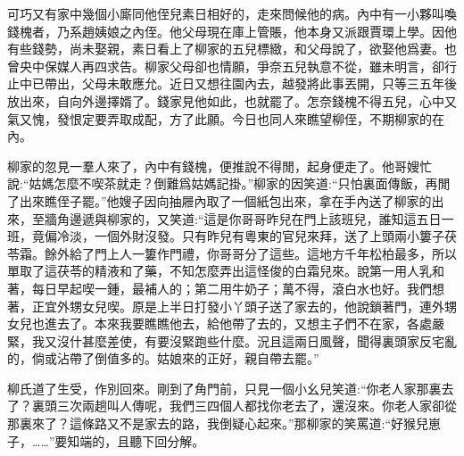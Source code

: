 \begin{parag}
    可巧又有家中幾個小廝同他侄兒素日相好的，走來問候他的病。內中有一小夥叫喚錢槐者，乃系趙姨娘之內侄。他父母現在庫上管賬，他本身又派跟賈環上學。因他有些錢勢，尚未娶親，素日看上了柳家的五兒標緻，和父母說了，欲娶他爲妻。也曾央中保媒人再四求告。柳家父母卻也情願，爭奈五兒執意不從，雖未明言，卻行止中已帶出，父母未敢應允。近日又想往園內去，越發將此事丟開，只等三五年後放出來，自向外邊擇婿了。錢家見他如此，也就罷了。怎奈錢槐不得五兒，心中又氣又愧，發恨定要弄取成配，方了此願。今日也同人來瞧望柳侄，不期柳家的在內。
\end{parag}


\begin{parag}
    柳家的忽見一羣人來了，內中有錢槐，便推說不得閒，起身便走了。他哥嫂忙說:“姑媽怎麼不喫茶就走？倒難爲姑媽記掛。”柳家的因笑道:“只怕裏面傳飯，再閒了出來瞧侄子罷。”他嫂子因向抽屜內取了一個紙包出來，拿在手內送了柳家的出來，至牆角邊遞與柳家的，又笑道:“這是你哥哥昨兒在門上該班兒，誰知這五日一班，竟偏冷淡，一個外財沒發。只有昨兒有粵東的官兒來拜，送了上頭兩小簍子茯苓霜。餘外給了門上人一簍作門禮，你哥哥分了這些。這地方千年松柏最多，所以單取了這茯苓的精液和了藥，不知怎麼弄出這怪俊的白霜兒來。說第一用人乳和著，每日早起喫一鍾，最補人的；第二用牛奶子；萬不得，滾白水也好。我們想著，正宜外甥女兒喫。原是上半日打發小丫頭子送了家去的，他說鎖著門，連外甥女兒也進去了。本來我要瞧瞧他去，給他帶了去的，又想主子們不在家，各處嚴緊，我又沒什甚麼差使，有要沒緊跑些什麼。況且這兩日風聲，聞得裏頭家反宅亂的，倘或沾帶了倒值多的。姑娘來的正好，親自帶去罷。”
\end{parag}


\begin{parag}
    柳氏道了生受，作別回來。剛到了角門前，只見一個小幺兒笑道:“你老人家那裏去了？裏頭三次兩趟叫人傳呢，我們三四個人都找你老去了，還沒來。你老人家卻從那裏來了？這條路又不是家去的路，我倒疑心起來。”那柳家的笑罵道:“好猴兒崽子，……”要知端的，且聽下回分解。
\end{parag}
